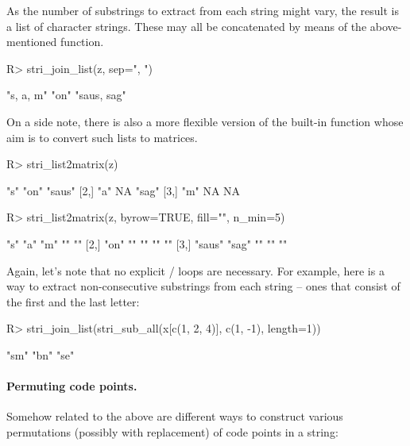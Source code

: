 \documentclass[nojss]{jss}
\begin{document}
As the number of substrings to extract from each string might vary,
the result is a list
of character strings. These may all be concatenated by means of the
above-mentioned  function.

\begin{Schunk}
\begin{Sinput}
R> stri_join_list(z, sep=", ")
\end{Sinput}
\begin{Soutput}
[1] "s, a, m"   "on"        "saus, sag"
\end{Soutput}
\end{Schunk}


On a side note, there is also a more flexible version
of the built-in  function whose
aim is to convert such lists to matrices.

\begin{Schunk}
\begin{Sinput}
R> stri_list2matrix(z)
\end{Sinput}
\begin{Soutput}
     [,1] [,2] [,3]
[1,] "s"  "on" "saus"
[2,] "a"  NA   "sag"
[3,] "m"  NA   NA
\end{Soutput}
\begin{Sinput}
R> stri_list2matrix(z, byrow=TRUE, fill="", n_min=5)
\end{Sinput}
\begin{Soutput}
     [,1]   [,2]  [,3] [,4] [,5]
[1,] "s"    "a"   "m"  ""   ""
[2,] "on"   ""    ""   ""   ""
[3,] "saus" "sag" ""   ""   ""
\end{Soutput}
\end{Schunk}


Again, let's note that no explicit / loops are necessary.
For example, here is a way to extract non-consecutive substrings from each string --
ones that consist of the first and the last letter:

\begin{Schunk}
\begin{Sinput}
R> stri_join_list(stri_sub_all(x[c(1, 2, 4)], c(1, -1), length=1))
\end{Sinput}
\begin{Soutput}
[1] "sm" "bn" "se"
\end{Soutput}
\end{Schunk}


\paragraph{Permuting code points.}
Somehow related to the above are different ways to construct
various permutations (possibly with replacement) of code points in a string:
\end{document}
